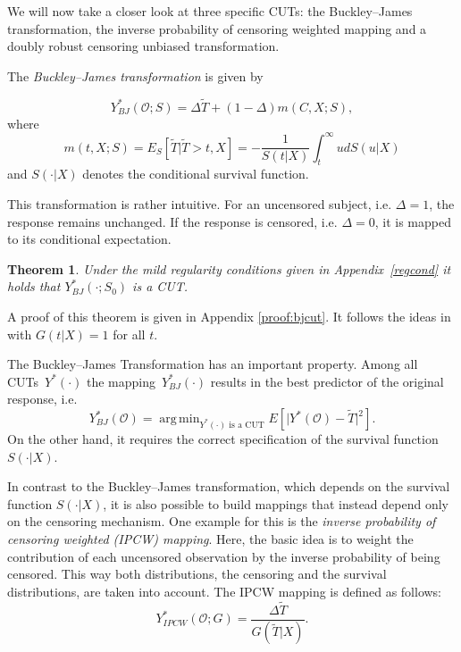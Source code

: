 \documentclass[12pt, a4paper]{scrartcl}
\theoremstyle{definition}
\theoremstyle{plain}
\newtheorem{Theorem}{Theorem}[section]
\numberwithin{equation}{section}
\numberwithin{figure}{section}
\numberwithin{table}{section}
\DeclareMathOperator*{\argmin}{arg\,min}
\begin{document}
	We will now take a closer look at three specific CUTs: the Buckley--James transformation, the inverse probability of censoring weighted mapping and a doubly robust censoring unbiased transformation.
	
	The \emph{Buckley--James transformation} is given by
	
	\begin{equation}\label{eq:bjtrafo}
		Y_{BJ}^* (\mathcal{O}; S) = \Delta \tilde{T} + (1-\Delta)m(C,X;S),
	\end{equation}
	where
	\begin{equation}\label{eq:condmean}
		m(t,X;S) = E_S[\tilde{T} \vert \tilde T > t, X] = -\frac{1}{S(t\vert X)} \int_t^{\infty} u dS(u\vert X)
	\end{equation}%
	and $S(\cdot\vert X)$ denotes the conditional survival function.
	
	
	This transformation is rather intuitive.
	For an uncensored subject, i.e. $\Delta = 1$, the response remains unchanged.
	If the response is censored, i.e. $\Delta = 0$, it is mapped to its conditional expectation. %
	
	\begin{Theorem}\label{thm:bj}
		Under the mild regularity conditions given in Appendix~\ref{regcond} it holds that $Y_{BJ}^*(\cdot; S_0)$ is a CUT.
	\end{Theorem}
	
	A proof of this theorem is given in Appendix \ref{proof:bjcut}.
	It follows the ideas in \citet*{drcut} with $G(t\vert X)=1$ for all $t$.
	
	The Buckley--James Transformation has an important property.
	Among all CUTs~$Y^*(\cdot)$ the mapping~$Y_{BJ}^* (\cdot)$ results in the best predictor of the original response, i.e.
	\begin{equation*}
	Y_{BJ}^* (\mathcal{O})= \argmin_{\text{$Y^*(\cdot)$~is~a~CUT}} E[ \vert Y^*(\mathcal{O}) - \tilde T \vert ^2].
	\end{equation*}
	On the other hand, it requires the correct specification of the survival function~$S(\cdot\vert X)$.

	In contrast to the Buckley--James transformation, which depends on the survival function $S(\cdot\vert X)$, it is also possible to build mappings that instead depend only on the censoring mechanism.
	One example for this is the \emph{inverse probability of censoring weighted (IPCW) mapping}.
	Here, the basic idea is to weight the contribution of each uncensored observation by the inverse probability of being censored.
	This way both distributions, the censoring and the survival distributions, are taken into account.
	The IPCW mapping is defined as follows:
	\begin{equation*}
	Y_{IPCW}^*(\mathcal{O}; G) = \frac{\Delta \tilde T}{G(\tilde T \vert X)}.
	\end{equation*}
\end{document}
